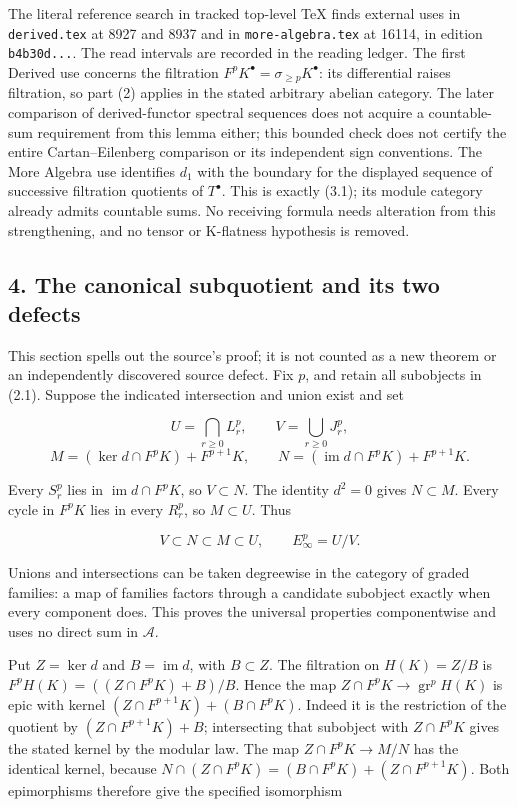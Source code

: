 \documentclass[11pt]{article}
\begin{document}
The literal reference search in tracked top-level TeX finds external uses in \texttt{derived.tex} at 8927 and 8937 and in \texttt{more-algebra.tex} at 16114, in edition \texttt{b4b30d...}. The read intervals are recorded in the reading ledger. The first Derived use concerns the filtration \(F^pK^\bullet=\sigma_{\geq p}K^\bullet\): its differential raises filtration, so part (2) applies in the stated arbitrary abelian category. The later comparison of derived-functor spectral sequences does not acquire a countable-sum requirement from this lemma either; this bounded check does not certify the entire Cartan--Eilenberg comparison or its independent sign conventions. The More Algebra use identifies \(d_1\) with the boundary for the displayed sequence of successive filtration quotients of \(T^\bullet\). This is exactly (3.1); its module category already admits countable sums. No receiving formula needs alteration from this strengthening, and no tensor or K-flatness hypothesis is removed.

\subsection{4. The canonical subquotient and its two defects}\label{note-06-the-canonical-subquotient-and-its-two-defects}

This section spells out the source's proof; it is not counted as a new theorem or an independently discovered source defect. Fix \(p\), and retain all subobjects in (2.1). Suppose the indicated intersection and union exist and set

\[
U=\bigcap_{r\geq0}L_r^p,\qquad V=\bigcup_{r\geq0}J_r^p,
\] \[
M=(\ker d\cap F^pK)+F^{p+1}K,\qquad
N=(\operatorname{im}d\cap F^pK)+F^{p+1}K.       \tag{4.1}
\]

Every \(S_r^p\) lies in \(\operatorname{im}d\cap F^pK\), so \(V\subset N\). The identity \(d^2=0\) gives \(N\subset M\). Every cycle in \(F^pK\) lies in every \(R_r^p\), so \(M\subset U\). Thus

\[
V\subset N\subset M\subset U,\qquad E_\infty^p=U/V.       \tag{4.2}
\]

Unions and intersections can be taken degreewise in the category of graded families: a map of families factors through a candidate subobject exactly when every component does. This proves the universal properties componentwise and uses no direct sum in \(\mathcal A\).

Put \(Z=\ker d\) and \(B=\operatorname{im}d\), with \(B\subset Z\). The filtration on \(H(K)=Z/B\) is \(F^pH(K)=((Z\cap F^pK)+B)/B\). Hence the map \(Z\cap F^pK\to\operatorname{gr}^pH(K)\) is epic with kernel \((Z\cap F^{p+1}K)+(B\cap F^pK)\). Indeed it is the restriction of the quotient by \((Z\cap F^{p+1}K)+B\); intersecting that subobject with \(Z\cap F^pK\) gives the stated kernel by the modular law. The map \(Z\cap F^pK\to M/N\) has the identical kernel, because \(N\cap(Z\cap F^pK)=(B\cap F^pK)+(Z\cap F^{p+1}K)\). Both epimorphisms therefore give the specified isomorphism
\end{document}
